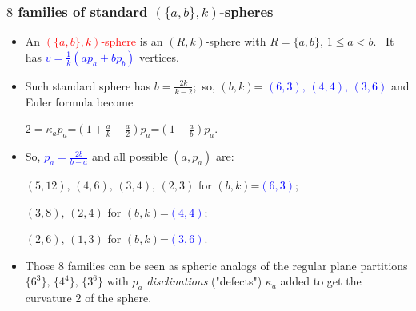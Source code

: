 \documentclass{beamer}
\begin{document}
\begin{frame}\frametitle{$8$ families of standard $(\{a,b\},k)$-spheres}



\begin{itemize}

\item An \textcolor{red}{$(\{a,b\},k)$-sphere} is an  $(R,k)$-sphere
with $R=\{a,b\}$, $1\le a < b$. $\,$ 
It has  \textcolor{blue}{$v$$=$$\frac{1}{k}(ap_a+bp_b)$} vertices.
\item 
Such standard sphere has $b=\frac{2k}{k-2}$;$\,$
 so, $(b,k)$=
\textcolor{blue}{$(6,3),\,(4,4),\,(3,6)$} 
and
Euler formula become

$2=\kappa_ap_a$=$(1+\frac{a}{k}-\frac{a}{2})p_a$=$(1-\frac{a}{b})p_a$.


\item So, \textcolor{blue}{$p_a=\frac{2b}{b-a}$}
and all possible
$(a,p_a)$ are:

 $(5,12),\, (4,6),\, (3,4),\, (2,3)$ for 
$(b,k)$=\textcolor{blue}{$(6,3)$};
         
$(3,8),\, (2,4)$ for $(b,k)$=\textcolor{blue}{$(4,4)$}; $\,\,$

$(2,6),\, (1,3)$ for $(b,k)$=\textcolor{blue}{$(3,6)$}.

\item Those $8$ families can be seen  as spheric analogs of the 
regular plane partitions $\{6^3\},\,\{4^4\},\,\{3^6\}$ with $p_a$ 
{\em disclinations} ("defects") $\kappa_a$   added to get the 
curvature $2$
of the sphere.


 \end{itemize}\end{frame}
\end{document}
